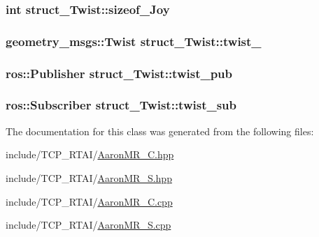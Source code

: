\label{classstruct__Twist_a2d3e2346abef34de6bb72a5b783a367e}
\hypertarget{classstruct__Twist_af6f8a2260faa75ff5e69195ea06dbdc5}{
\subsubsection[{sizeof\_\-Joy}]{\setlength{\rightskip}{0pt plus 5cm}int {\bf struct\_\-Twist::sizeof\_\-Joy}}}
\label{classstruct__Twist_af6f8a2260faa75ff5e69195ea06dbdc5}
\hypertarget{classstruct__Twist_a9df8e9fe3a53331a21e015a7a68346f1}{
\subsubsection[{twist\_\-}]{\setlength{\rightskip}{0pt plus 5cm}geometry\_\-msgs::Twist {\bf struct\_\-Twist::twist\_\-}}}
\label{classstruct__Twist_a9df8e9fe3a53331a21e015a7a68346f1}
\hypertarget{classstruct__Twist_aee5b5a8a8f139c8d94c50ea74aa242df}{
\subsubsection[{twist\_\-pub}]{\setlength{\rightskip}{0pt plus 5cm}ros::Publisher {\bf struct\_\-Twist::twist\_\-pub}}}
\label{classstruct__Twist_aee5b5a8a8f139c8d94c50ea74aa242df}
\hypertarget{classstruct__Twist_aec635faa1bd8d788f567f7fdfe425dfb}{
\subsubsection[{twist\_\-sub}]{\setlength{\rightskip}{0pt plus 5cm}ros::Subscriber {\bf struct\_\-Twist::twist\_\-sub}}}
\label{classstruct__Twist_aec635faa1bd8d788f567f7fdfe425dfb}


The documentation for this class was generated from the following files:\begin{DoxyCompactItemize}
\item 
include/TCP\_\-RTAI/\hyperlink{AaronMR__C_8hpp}{AaronMR\_\-C.hpp}\item 
include/TCP\_\-RTAI/\hyperlink{AaronMR__S_8hpp}{AaronMR\_\-S.hpp}\item 
include/TCP\_\-RTAI/\hyperlink{AaronMR__C_8cpp}{AaronMR\_\-C.cpp}\item 
include/TCP\_\-RTAI/\hyperlink{AaronMR__S_8cpp}{AaronMR\_\-S.cpp}\end{DoxyCompactItemize}

